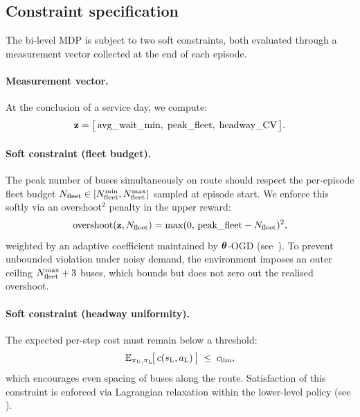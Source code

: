 \subsection{Constraint specification}
\label{sec:constraints}

The bi-level MDP is subject to two soft constraints, both evaluated through a measurement vector collected at the end of each episode.

\paragraph{Measurement vector.}
At the conclusion of a service day, we compute:
\begin{equation}
  \label{eq:measurement}
  \mathbf{z} = \bigl[\,\text{avg\_wait\_min},\;\text{peak\_fleet},\;\text{headway\_CV}\,\bigr].
\end{equation}

\paragraph{Soft constraint (fleet budget).}
The peak number of buses simultaneously on route should respect the per-episode fleet budget $N_{\mathrm{fleet}} \in [N_{\mathrm{fleet}}^{\min}, N_{\mathrm{fleet}}^{\max}]$ sampled at episode start. We enforce this softly via an overshoot$^2$ penalty in the upper reward:
\begin{equation}
  \label{eq:soft_fleet}
  \mathrm{overshoot}(\mathbf{z}, N_{\mathrm{fleet}}) = \max(0,\, \text{peak\_fleet} - N_{\mathrm{fleet}})^2,
\end{equation}
weighted by an adaptive coefficient maintained by $\boldsymbol{\theta}$-OGD (see~). To prevent unbounded violation under noisy demand, the environment imposes an outer ceiling $N_{\mathrm{fleet}}^{\max} + 3$ buses, which bounds but does not zero out the realised overshoot.

\paragraph{Soft constraint (headway uniformity).}
The expected per-step cost must remain below a threshold:
\begin{equation}
  \label{eq:soft_constraint}
  \mathbb{E}_{\pi_{\mathrm{U}},\pi_{\mathrm{L}}}\!\bigl[\,c(s_{\mathrm{L}},a_{\mathrm{L}})\,\bigr] \;\leq\; c_{\mathrm{lim}},
\end{equation}
which encourages even spacing of buses along the route.
Satisfaction of this constraint is enforced via Lagrangian relaxation within the lower-level policy (see ).

